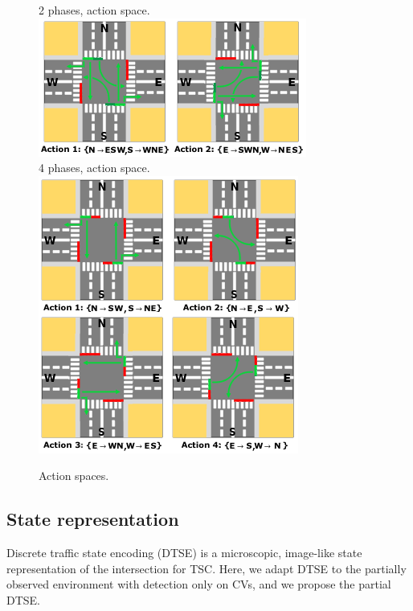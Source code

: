 \documentclass[journal]{IEEEtran}
\begin{document}
\begin{figure}[htbp]
  \begin{center}
    2 phases, action space. \\
    \includegraphics[width=0.8\linewidth,keepaspectratio]{img/model/2phases.png}
    \bigskip \\
    4 phases, action space. \\
    \includegraphics[width=0.8\linewidth,keepaspectratio]{img/model/4phases.png}  
    \caption{Action spaces.}
    \label{fig:action_space}
  \end{center}
\end{figure}

\subsection{State representation}

Discrete traffic state encoding (DTSE) \cite{gao2017adaptative} is a microscopic, image-like state representation of the intersection for TSC. Here, we adapt DTSE to the partially observed environment with detection only on CVs, and we propose the partial DTSE.
\end{document}
